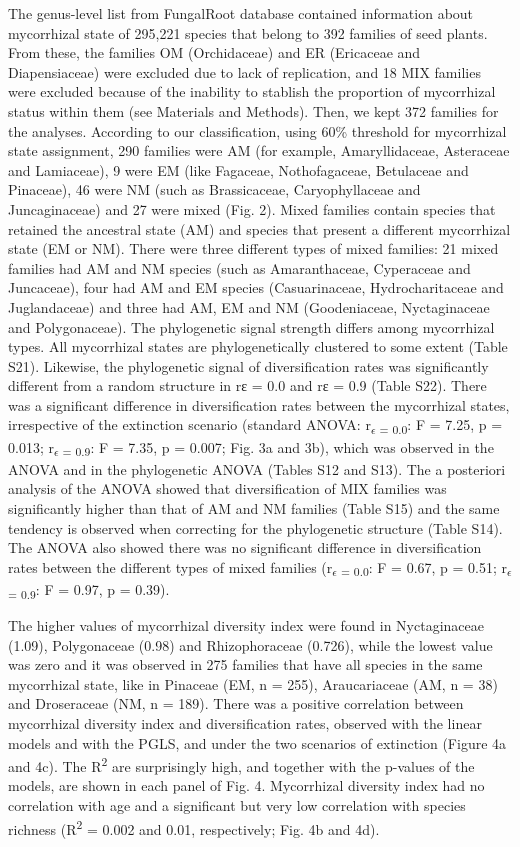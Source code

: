 \documentclass[12pt,]{article}
\begin{document}
The genus-level list from FungalRoot database contained information
about mycorrhizal state of 295,221 species that belong to 392 families
of seed plants. From these, the families OM (Orchidaceae) and ER
(Ericaceae and Diapensiaceae) were excluded due to lack of replication,
and 18 MIX families were excluded because of the inability to stablish
the proportion of mycorrhizal status within them (see Materials and
Methods). Then, we kept 372 families for the analyses. According to our
classification, using 60\% threshold for mycorrhizal state assignment,
290 families were AM (for example, Amaryllidaceae, Asteraceae and
Lamiaceae), 9 were EM (like Fagaceae, Nothofagaceae, Betulaceae and
Pinaceae), 46 were NM (such as Brassicaceae, Caryophyllaceae and
Juncaginaceae) and 27 were mixed (Fig. 2). Mixed families contain
species that retained the ancestral state (AM) and species that present
a different mycorrhizal state (EM or NM). There were three different
types of mixed families: 21 mixed families had AM and NM species (such
as Amaranthaceae, Cyperaceae and Juncaceae), four had AM and EM species
(Casuarinaceae, Hydrocharitaceae and Juglandaceae) and three had AM, EM
and NM (Goodeniaceae, Nyctaginaceae and Polygonaceae). The phylogenetic
signal strength differs among mycorrhizal types. All mycorrhizal states
are phylogenetically clustered to some extent (Table S21). Likewise, the
phylogenetic signal of diversification rates was significantly different
from a random structure in rɛ = 0.0 and rɛ = 0.9 (Table S22). There was
a significant difference in diversification rates between the
mycorrhizal states, irrespective of the extinction scenario (standard
ANOVA: r\textsubscript{$\epsilon$ = 0.0}: F = 7.25, p = 0.013;
r\textsubscript{$\epsilon$ = 0.9}: F = 7.35, p = 0.007; Fig. 3a and 3b),
which was observed in the ANOVA and in the phylogenetic ANOVA (Tables
S12 and S13). The a posteriori analysis of the ANOVA showed that
diversification of MIX families was significantly higher than that of AM
and NM families (Table S15) and the same tendency is observed when
correcting for the phylogenetic structure (Table S14). The ANOVA also
showed there was no significant difference in diversification rates
between the different types of mixed families
(r\textsubscript{$\epsilon$ = 0.0}: F = 0.67, p = 0.51;
r\textsubscript{$\epsilon$ = 0.9}: F = 0.97, p = 0.39).

The higher values of mycorrhizal diversity index were found in
Nyctaginaceae (1.09), Polygonaceae (0.98) and Rhizophoraceae (0.726),
while the lowest value was zero and it was observed in 275 families that
have all species in the same mycorrhizal state, like in Pinaceae (EM, n
= 255), Araucariaceae (AM, n = 38) and Droseraceae (NM, n = 189). There
was a positive correlation between mycorrhizal diversity index and
diversification rates, observed with the linear models and with the
PGLS, and under the two scenarios of extinction (Figure 4a and 4c). The
R\textsuperscript{2} are surprisingly high, and together with the
p-values of the models, are shown in each panel of Fig. 4. Mycorrhizal
diversity index had no correlation with age and a significant but very
low correlation with species richness (R\textsuperscript{2} = 0.002 and
0.01, respectively; Fig. 4b and 4d).
\end{document}
